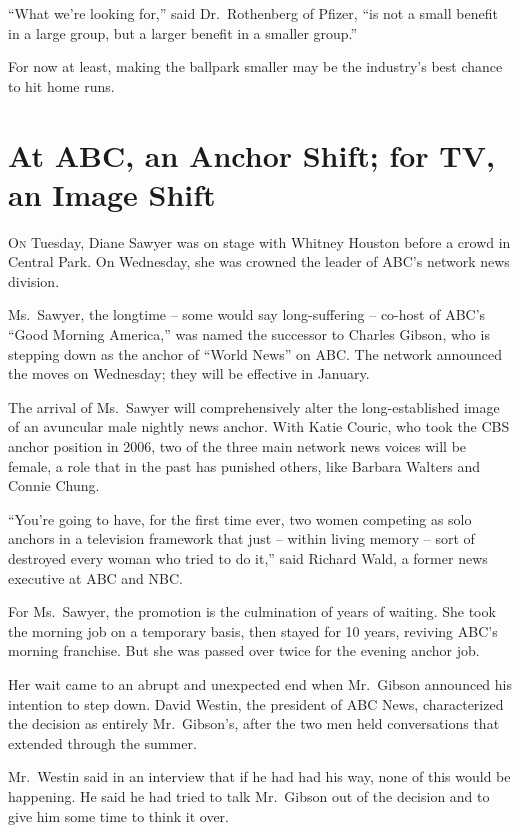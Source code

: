 ﻿\documentclass[12pt]{article}
\begin{document}
``What we're looking for,'' said Dr.~Rothenberg of Pfizer, ``is not a small benefit in a large
group, but a larger benefit in a smaller group.''

For now at least, making the ballpark smaller may be the industry's best chance to hit home runs.

\section{At ABC, an Anchor Shift; for TV, an Image Shift}

\lettrine{O}{n} Tuesday, Diane Sawyer was on stage with Whitney Houston before a crowd in Central
Park. On Wednesday, she was crowned the leader of ABC's network news division.

Ms.~Sawyer, the longtime -- some would say long-suffering -- co-host of ABC's ``Good Morning
America,'' was named the successor to Charles Gibson, who is stepping down as the anchor of ``World
News'' on ABC. The network announced the moves on Wednesday; they will be effective in January.

The arrival of Ms.~Sawyer will comprehensively alter the long-established image of an avuncular male
nightly news anchor. With Katie Couric, who took the CBS anchor position in 2006, two of the three
main network news voices will be female, a role that in the past has punished others, like Barbara
Walters and Connie Chung.

``You're going to have, for the first time ever, two women competing as solo anchors in a television
framework that just -- within living memory -- sort of destroyed every woman who tried to do it,''
said Richard Wald, a former news executive at ABC and NBC.

For Ms.~Sawyer, the promotion is the culmination of years of waiting. She took the morning job on a
temporary basis, then stayed for 10 years, reviving ABC's morning franchise. But she was passed over
twice for the evening anchor job.

Her wait came to an abrupt and unexpected end when Mr.~Gibson announced his intention to step down.
David Westin, the president of ABC News, characterized the decision as entirely Mr.~Gibson's, after
the two men held conversations that extended through the summer.

Mr.~Westin said in an interview that if he had had his way, none of this would be happening. He said
he had tried to talk Mr.~Gibson out of the decision and to give him some time to think it over.
\end{document}

